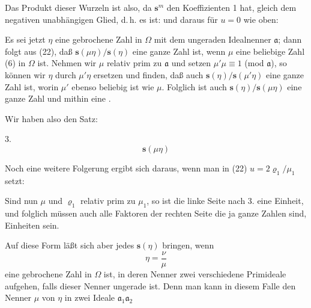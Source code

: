 
Das Produkt dieser Wurzeln ist also, da $\boldsymbol{s}^m$ den Koeffizienten 1
hat, gleich dem negativen unabhängigen Glied, d.\,h. es ist:
und daraus für $u = 0$ wie oben:

Es sei jetzt $\eta$ eine gebrochene Zahl in $\Omega$ mit dem ungeraden
Idealnenner $\mathfrak{a}$; dann folgt aus (22), daß $\boldsymbol{s}(\mu\eta)/\boldsymbol{s}(\eta)$ eine ganze
Zahl ist, wenn $\mu$ eine beliebige Zahl (6) in $\Omega$ ist. Nehmen wir
$\mu$ relativ prim zu $\mathfrak{a}$ und setzen $\mu'\mu \equiv 1$ (mod $\mathfrak{a}$), so können wir
$\eta$ durch $\mu'\eta$ ersetzen und finden, daß auch $\boldsymbol{s}(\eta)/\boldsymbol{s}(\mu'\eta)$
eine ganze Zahl ist, worin $\mu'$ ebenso beliebig ist wie $\mu$. Folglich ist
auch $\boldsymbol{s}(\eta)/\boldsymbol{s}(\mu\eta)$ eine ganze Zahl und mithin eine .

Wir haben also den Satz:

3. 
\[
\boldsymbol{s}(\mu\eta)
\]

Noch eine weitere Folgerung ergibt sich daraus, wenn man
in (22) $u = 2\varrho_1/\mu_1$ setzt:

Sind nun $\mu$ und $\varrho_1$ relativ prim zu $\mu_1$, so ist die linke Seite
nach 3. eine Einheit, und folglich müssen auch alle Faktoren der
rechten Seite
die ja ganze Zahlen sind, Einheiten sein.

Auf diese Form läßt sich aber jedes $\boldsymbol{s}(\eta)$ bringen, wenn
\[
\eta = \frac{\nu}{\mu}
\]
eine gebrochene Zahl in $\Omega$ ist, in deren Nenner zwei verschiedene
Primideale aufgehen, falls dieser Nenner ungerade ist. Denn man
kann in diesem Falle den Nenner $\mu$ von $\eta$ in zwei Ideale $\mathfrak{a}_1\mathfrak{a}_2$
